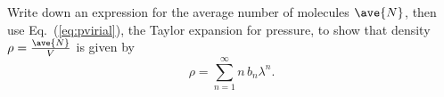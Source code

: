 \smallskip \subp
Write down an expression for the average number of molecules 
$\ave{N}$,
then use Eq.~(\ref{eq:pvirial}),
the Taylor expansion for pressure,
to show that density $\rho = \frac{\ave{N}}{V}$ is given by
\begin{equation}
\rho = \sum_{n=1}^\infty n\, b_n \lambda^n .
\label{eq:rholambda}
\end{equation}

